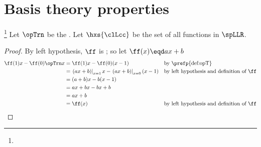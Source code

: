 \section{Basis theory properties}
\begin{example}
\footnote{
  }
\label{ex:TD_flinear}
Let $\opTrn$ be the  .
Let $\hxs{\clLcc}$ be the set of all  functions in $\spLLR$.
\end{example}
\begin{proof}
By left hypothesis, $\ff$ is ; so let $\ff(x)\eqd ax + b$
\begin{align*}
  \ff(1)x - \ff(0)\opTrn x
    &= \ff(1)x - \ff(0)(x-1)
    && \text{by \prefp{def:opT}}
  \\&= \left.(ax+b)\right|_{x=1}x - \left.(ax+b)\right|_{x=0}(x-1)
    && \text{by left hypothesis and definition of $\ff$}
  \\&= (a+b)x - b(x-1)
  \\&= ax+bx-bx+b
  \\&= ax+b
  \\&= \ff(x)
    && \text{by left hypothesis and definition of $\ff$}
\end{align*}
\end{proof}

